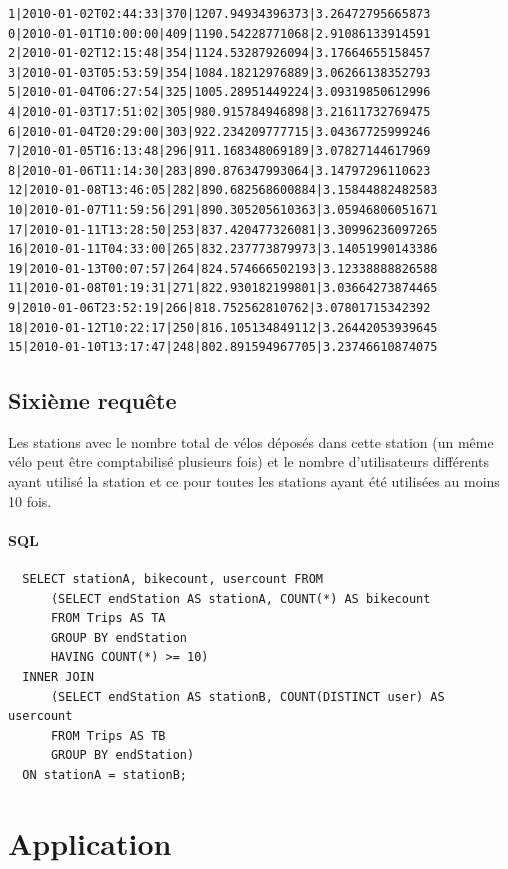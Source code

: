 \documentclass[a4paper]{article}
\begin{document}
    \begin{verbatim}
1|2010-01-02T02:44:33|370|1207.94934396373|3.26472795665873
0|2010-01-01T10:00:00|409|1190.54228771068|2.91086133914591
2|2010-01-02T12:15:48|354|1124.53287926094|3.17664655158457
3|2010-01-03T05:53:59|354|1084.18212976889|3.06266138352793
5|2010-01-04T06:27:54|325|1005.28951449224|3.09319850612996
4|2010-01-03T17:51:02|305|980.915784946898|3.21611732769475
6|2010-01-04T20:29:00|303|922.234209777715|3.04367725999246
7|2010-01-05T16:13:48|296|911.168348069189|3.07827144617969
8|2010-01-06T11:14:30|283|890.876347993064|3.14797296110623
12|2010-01-08T13:46:05|282|890.682568600884|3.15844882482583
10|2010-01-07T11:59:56|291|890.305205610363|3.05946806051671
17|2010-01-11T13:28:50|253|837.420477326081|3.30996236097265
16|2010-01-11T04:33:00|265|832.237773879973|3.14051990143386
19|2010-01-13T00:07:57|264|824.574666502193|3.12338888826588
11|2010-01-08T01:19:31|271|822.930182199801|3.03664273874465
9|2010-01-06T23:52:19|266|818.752562810762|3.07801715342392
18|2010-01-12T10:22:17|250|816.105134849112|3.26442053939645
15|2010-01-10T13:17:47|248|802.891594967705|3.23746610874075
    \end{verbatim}



\subsection{Sixième requête}
    Les stations avec le nombre total de vélos déposés dans cette station (un même vélo peut être comptabilisé plusieurs fois) et le nombre d'utilisateurs différents ayant utilisé la station et ce pour toutes les stations ayant été utilisées au moins 10 fois.

    \paragraph{SQL}
  \begin{verbatim}
  SELECT stationA, bikecount, usercount FROM 
      (SELECT endStation AS stationA, COUNT(*) AS bikecount
      FROM Trips AS TA
      GROUP BY endStation
      HAVING COUNT(*) >= 10)
  INNER JOIN
      (SELECT endStation AS stationB, COUNT(DISTINCT user) AS usercount
      FROM Trips AS TB
      GROUP BY endStation)
  ON stationA = stationB;
  \end{verbatim}




\section{Application}
\end{document}
